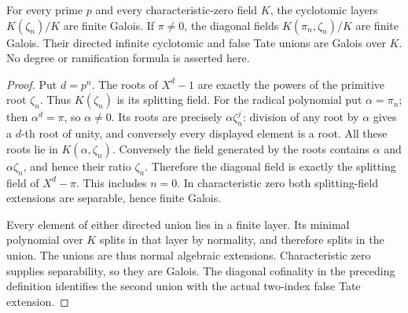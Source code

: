 \begin{lemma}
\label{ft:galois-layers}
\leanok
For every prime $p$ and every characteristic-zero field $K$, the
cyclotomic layers $K(\zeta_n)/K$ are finite Galois. If $\pi\ne0$,
the diagonal fields $K(\pi_n,\zeta_n)/K$ are finite Galois. Their
directed infinite cyclotomic and false Tate unions are Galois over $K$.
No degree or ramification formula is asserted here.
\end{lemma}
\begin{proof}
Put $d=p^n$. The roots of $X^d-1$ are exactly the powers of the
primitive root $\zeta_n$. Thus $K(\zeta_n)$ is its splitting field.
For the radical polynomial put $\alpha=\pi_n$; then $\alpha^d=\pi$,
so $\alpha\ne0$. Its roots are precisely $\alpha\zeta_n^j$:
division of any root by $\alpha$ gives a $d$-th root of unity, and
conversely every displayed element is a root. All these roots lie in
$K(\alpha,\zeta_n)$. Conversely the field generated by the roots
contains $\alpha$ and $\alpha\zeta_n$, and hence their ratio
$\zeta_n$. Therefore the diagonal field is exactly the splitting
field of $X^d-\pi$. This includes $n=0$. In characteristic zero both
splitting-field extensions are separable, hence finite Galois.

Every element of either directed union lies in a finite layer. Its
minimal polynomial over $K$ splits in that layer by normality, and
therefore splits in the union. The unions are thus normal algebraic
extensions. Characteristic zero supplies separability, so they are
Galois. The diagonal cofinality in the preceding definition identifies
the second union with the actual two-index false Tate extension.
\end{proof}

